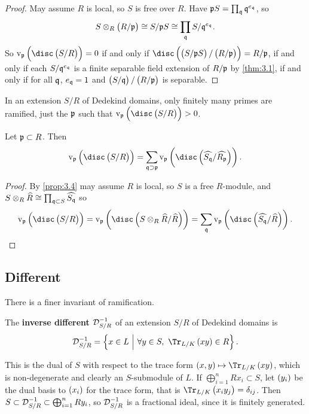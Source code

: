 \begin{proof}
May assume $ R $ is local, so $ S $ is free over $ R $. Have $ \mathfrak{p} S = \prod_{\mathfrak{q}} \mathfrak{q}^{e_{\mathfrak{q}}} $, so
$$ S \otimes_R \br{R / \ppp} \cong S / \ppp S \cong \prod_\qqq S / \qqq^{e_\qqq}. $$
So $ \v_\ppp\br{\disc\br{S / R}} = 0 $ if and only if $ \disc\br{\br{S / \ppp S} / \br{R / \ppp}} = R / \ppp $, if and only if each $ S / \mathfrak{q}^{e_{\mathfrak{q}}} $ is a finite separable field extension of $ R / \mathfrak{p} $ by \ref{thm:3.1}, if and only if for all $ \mathfrak{q} $, $ e_{\mathfrak{q}} = 1 $ and $ \br{S / \qqq} / \br{R / \ppp} $ is separable.
\end{proof}

\begin{corollary}
In an extension $ S / R $ of Dedekind domains, only finitely many primes are ramified, just the $ \mathfrak{p} $ such that $ \v_\ppp\br{\disc\br{S / R}} > 0 $.
\end{corollary}

\begin{proposition}
Let $ \mathfrak{p} \subset R $. Then
$$ \v_\ppp\br{\disc\br{S / R}} = \sum_{\qqq \supset \ppp} \v_\ppp\br{\disc\br{\widehat{S_\qqq} / \widehat{R_\ppp}}}. $$
\end{proposition}

\begin{proof}
By \ref{prop:3.4} may assume $ R $ is local, so $ S $ is a free $ R $-module, and $ S \otimes_R \widehat{R} \cong \prod_{\mathfrak{q} \subset S} \widehat{S_{\mathfrak{q}}} $ so
$$ \v_\ppp\br{\disc\br{S / R}} = \v_\ppp\br{\disc\br{S \otimes_R \widehat{R} / \widehat{R}}} = \sum_\qqq \v_\ppp\br{\disc\br{\widehat{S_\qqq} / \widehat{R}}}. $$
\end{proof}

\pagebreak

\subsection{Different}

There is a finer invariant of ramification.

\begin{definition*}
The \textbf{inverse different} $ \mathcal{D}_{S / R}^{-1} $ of an extension $ S / R $ of Dedekind domains is
$$ \DDD_{S / R}^{-1} = \cbr{x \in L \st \forall y \in S, \ \Tr_{L / K}\br{xy} \in R}. $$
\end{definition*}

This is the dual of $ S $ with respect to the trace form $ \br{x, y} \mapsto \Tr_{L / K}\br{xy} $, which is non-degenerate and clearly an $ S $-submodule of $ L $. If $ \bigoplus_{i = 1}^n Rx_i \subset S $, let $ \br{y_i} $ be the dual basis to $ \br{x_i} $ for the trace form, that is $ \Tr_{L / K}\br{x_iy_j} = \delta_{ij} $. Then $ S \subset \mathcal{D}_{S / R}^{-1} \subset \bigoplus_{i = 1}^n Ry_i $, so $ \mathcal{D}_{S / R}^{-1} $ is a fractional ideal, since it is finitely generated.

